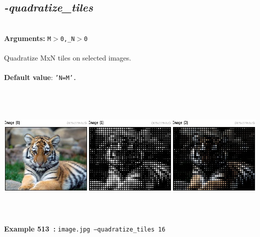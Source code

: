 \documentclass[a4paper,11pt,twoside]{book}
\begin{document}
\subsection{\emph{-quadratize\_tiles} }\vspace*{-0.5em}
~\\\textbf{Arguments: } 
{\small \texttt{M$>$0,\_N$>$0}}\\~\\
Quadratize MxN tiles on selected images.
~\\~\\\textbf{Default value}: {\small \texttt{'N=M'.}}
\begin{center}\includegraphics[keepaspectratio=true,height=7cm,width=\textwidth]{img/gmic_def513.jpg}\\
{\footnotesize \textbf{Example 513~:} \texttt{image.jpg --quadratize\_tiles 16}}
\end{center}
\end{document}
